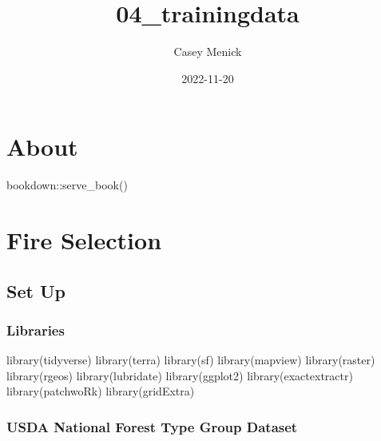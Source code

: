 \documentclass[
]{book}
\title{04\_trainingdata}
\author{Casey Menick}
\date{2022-11-20}
\newenvironment{Shaded}{\begin{snugshade}}{\end{snugshade}}
\newcommand{\FunctionTok}[1]{\textcolor[rgb]{0.00,0.00,0.00}{#1}}
\newcommand{\NormalTok}[1]{#1}
\newcommand{\SpecialCharTok}[1]{\textcolor[rgb]{0.00,0.00,0.00}{#1}}
\begin{document}
\maketitle

{
\setcounter{tocdepth}{1}
\tableofcontents
}
\hypertarget{about}{%
\chapter{About}\label{about}}

\begin{Shaded}
\begin{Highlighting}[]
\NormalTok{bookdown}\SpecialCharTok{::}\FunctionTok{serve\_book}\NormalTok{()}
\end{Highlighting}
\end{Shaded}

\hypertarget{fire-selection}{%
\chapter{Fire Selection}\label{fire-selection}}

\hypertarget{set-up}{%
\section{Set Up}\label{set-up}}

\hypertarget{libraries}{%
\subsection{Libraries}\label{libraries}}

\begin{Shaded}
\begin{Highlighting}[]
\FunctionTok{library}\NormalTok{(tidyverse)}
\FunctionTok{library}\NormalTok{(terra)}
\FunctionTok{library}\NormalTok{(sf)}
\FunctionTok{library}\NormalTok{(mapview)}
\FunctionTok{library}\NormalTok{(raster)}
\FunctionTok{library}\NormalTok{(rgeos)}
\FunctionTok{library}\NormalTok{(lubridate)}
\FunctionTok{library}\NormalTok{(ggplot2)}
\FunctionTok{library}\NormalTok{(exactextractr)}
\FunctionTok{library}\NormalTok{(patchwoRk)}
\FunctionTok{library}\NormalTok{(gridExtra)}
\end{Highlighting}
\end{Shaded}

\hypertarget{usda-national-forest-type-group-dataset}{%
\subsection{USDA National Forest Type Group Dataset}\label{usda-national-forest-type-group-dataset}}
\end{document}
